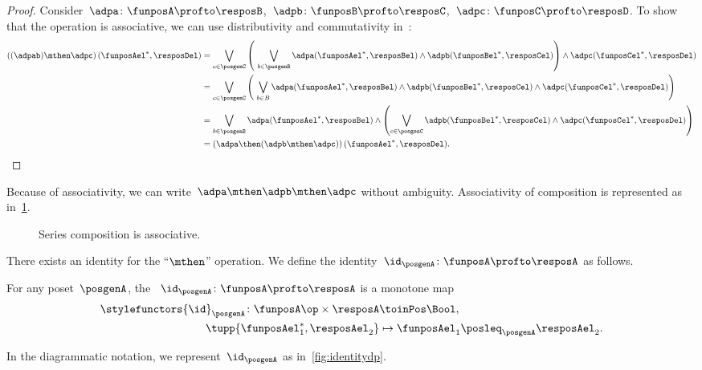 \begin{proof}
    Consider~$\adpa\colon \funposA\profto \resposB$,~$\adpb\colon \funposB \profto \resposC$,~$\adpc\colon \funposC\profto \resposD$.
    To show that the operation is associative, we can use distributivity and commutativity in~\Bool:
%
    \begin{equation}
        \label{eq:dp_associativity}
        \begin{aligned}
            \left((\adpab) \mthen \adpc\right) (\funposAel^*,\resposDel)
            &= \bigvee_{c \in \posgenC} \left (\ \bigvee_{b\in \posgenB} \adpa(\funposAel^*,\resposBel) \wedge \adpb(\funposBel^*,\resposCel) \right )  \wedge  \adpc (\funposCel^*, \resposDel) \\
            &= \bigvee_{c \in \posgenC} \left (\ \bigvee_{b\in B } \adpa(\funposAel^*,\resposBel)
            \wedge \adpb(\funposBel^*,\resposCel) \wedge \adpc (\funposCel^*, \resposDel)
            \right ) \\
            &= \bigvee_{b \in \posgenB } \adpa(\funposAel^*,\resposBel) \wedge \left ( \bigvee_{c\in \posgenC} \adpb(\funposBel^*,\resposCel) \wedge \adpc (\funposCel^*, \resposDel) \right ) \\
            &= \left(\adpa \then (\adpb \mthen \adpc )\right) (\funposAel^*, \resposDel).
        \end{aligned}
    \end{equation}
%
\end{proof}

Because of associativity, we can write~$\adpa\mthen \adpb\mthen \adpc$ without ambiguity.
Associativity of composition is represented as in~\cref{fig:compositionassociativity}.

\begin{figure}[h!]
    \centering
    \caption{Series composition is associative.}
    \label{fig:compositionassociativity}
\end{figure}

There exists an identity for the ``$\mthen$'' operation.
We define the identity~$\id_\posgenA \colon \funposA \profto \resposA$ as follows.

\begin{definition}
    \label{def:dp-identity}
    For any poset~$\posgenA$, the \emph{}~$\id_\posgenA \colon \funposA \profto \resposA$ is a monotone map
    \begin{equation}
        \begin{aligned}
            \stylefunctors{\id}_\posgenA \colon \funposA\op \times \resposA & \toinPos   \Bool, \label{eq:identity}\\
            \tupp{\funposAel_1^*, \resposAel_2} & \mapsto \funposAel_1 \posleq_{\posgenA} \resposAel_2.
        \end{aligned}
    \end{equation}
\end{definition}
In the diagrammatic notation, we represent~$\id_\posgenA$ as in~\cref{fig:identitydp}.


